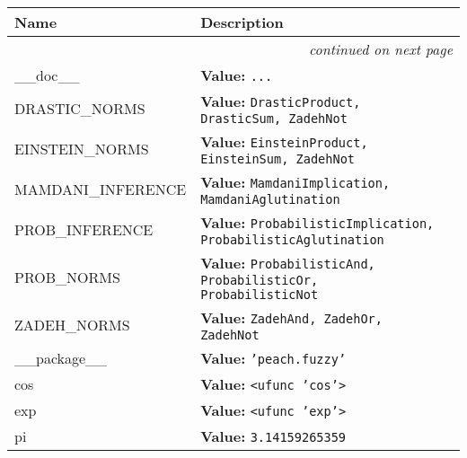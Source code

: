    \vspace{-1cm}
\hspace{\varindent}\begin{longtable}{|p{\varnamewidth}|p{\vardescrwidth}|l}
\cline{1-2}
\cline{1-2} \centering \textbf{Name} & \centering \textbf{Description}& \\
\cline{1-2}
\endhead\cline{1-2}\multicolumn{3}{r}{\small\textit{continued on next page}}\\\endfoot\cline{1-2}
\endlastfoot\raggedright \_\-\_\-d\-o\-c\-\_\-\_\- & \raggedright \textbf{Value:} 
{\tt \texttt{...}}&\\
\cline{1-2}
\raggedright D\-R\-A\-S\-T\-I\-C\-\_\-N\-O\-R\-M\-S\- & \raggedright \textbf{Value:} 
{\tt DrasticProduct, DrasticSum, ZadehNot}&\\
\cline{1-2}
\raggedright E\-I\-N\-S\-T\-E\-I\-N\-\_\-N\-O\-R\-M\-S\- & \raggedright \textbf{Value:} 
{\tt EinsteinProduct, EinsteinSum, ZadehNot}&\\
\cline{1-2}
\raggedright M\-A\-M\-D\-A\-N\-I\-\_\-I\-N\-F\-E\-R\-E\-N\-C\-E\- & \raggedright \textbf{Value:} 
{\tt MamdaniImplication, MamdaniAglutination}&\\
\cline{1-2}
\raggedright P\-R\-O\-B\-\_\-I\-N\-F\-E\-R\-E\-N\-C\-E\- & \raggedright \textbf{Value:} 
{\tt ProbabilisticImplication, ProbabilisticAglutination}&\\
\cline{1-2}
\raggedright P\-R\-O\-B\-\_\-N\-O\-R\-M\-S\- & \raggedright \textbf{Value:} 
{\tt ProbabilisticAnd, ProbabilisticOr, ProbabilisticNot}&\\
\cline{1-2}
\raggedright Z\-A\-D\-E\-H\-\_\-N\-O\-R\-M\-S\- & \raggedright \textbf{Value:} 
{\tt ZadehAnd, ZadehOr, ZadehNot}&\\
\cline{1-2}
\raggedright \_\-\_\-p\-a\-c\-k\-a\-g\-e\-\_\-\_\- & \raggedright \textbf{Value:} 
{\tt \texttt{'}\texttt{peach.fuzzy}\texttt{'}}&\\
\cline{1-2}
\raggedright c\-o\-s\- & \raggedright \textbf{Value:} 
{\tt {\textless}ufunc 'cos'{\textgreater}}&\\
\cline{1-2}
\raggedright e\-x\-p\- & \raggedright \textbf{Value:} 
{\tt {\textless}ufunc 'exp'{\textgreater}}&\\
\cline{1-2}
\raggedright p\-i\- & \raggedright \textbf{Value:} 
{\tt 3.14159265359}&\\
\cline{1-2}
\end{longtable}



